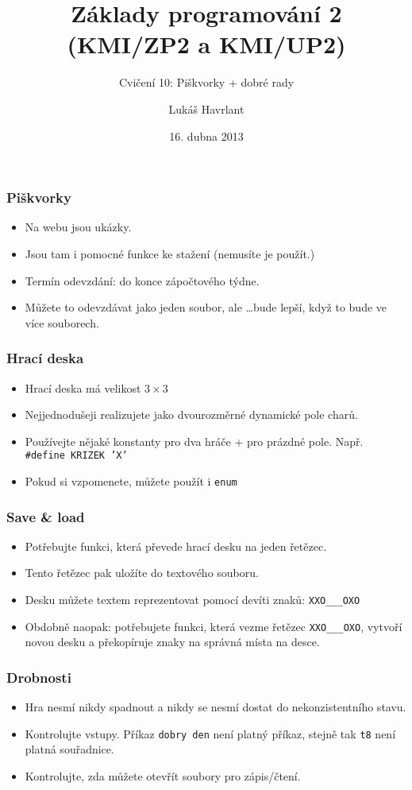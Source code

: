 \documentclass{beamer}
\title{Základy programování 2 (KMI/ZP2 a KMI/UP2)}
\subtitle{Cvičení 10: Piškvorky + dobré rady}
\author{Lukáš Havrlant}
\date{16. dubna 2013}
\institute{Univerzita Palackého}
\newenvironment{itemizex}%
  {\large \begin{itemize}%
    \setlength{\itemsep}{8pt}%
    \setlength{\parskip}{8pt}}%
  {\end{itemize}}
\begin{document}
\begin{frame}[t,plain]
\titlepage
\end{frame}


\begin{frame}[t,fragile]\frametitle{Piškvorky} 
    \begin{itemizex}
        \item Na webu jsou ukázky. 
        \item Jsou tam i pomocné funkce ke stažení (nemusíte je použít.)
        \item Termín odevzdání: do konce zápočtového týdne.
        \item Můžete to odevzdávat jako jeden soubor, ale \dots bude lepší, když to bude ve více souborech.
    \end{itemizex}
\end{frame}



\begin{frame}[t,fragile]\frametitle{Hrací deska} 
    \begin{itemizex}
        \item Hrací deska má velikost $3\times3$
        \item Nejjednodušeji realizujete jako dvourozměrné dynamické pole charů.
        \item Používejte nějaké konstanty pro dva hráče + pro prázdné pole. Např. \texttt{\#define KRIZEK 'X'}
        \item Pokud si vzpomenete, můžete použít i \texttt{enum}
    \end{itemizex}
\end{frame}


\begin{frame}[t,fragile]\frametitle{Save \& load} 
    \begin{itemizex}
        \item Potřebujte funkci, která převede hrací desku na jeden řetězec. 
        \item Tento řetězec pak uložíte do textového souboru.
        \item Desku můžete textem reprezentovat pomocí devíti znaků: \texttt{XXO\_\_\_OXO}
        \item Obdobně naopak: potřebujete funkci, která vezme řetězec \texttt{XXO\_\_\_OXO}, vytvoří novou desku a překopíruje znaky na správná místa na desce.
    \end{itemizex}
\end{frame}


\begin{frame}[t,fragile]\frametitle{Drobnosti} 
    \begin{itemizex}
        \item Hra nesmí nikdy spadnout a nikdy se nesmí dostat do nekonzistentního stavu.
        \item Kontrolujte vstupy. Příkaz \texttt{dobry den} není platný příkaz, stejně tak \texttt{t8} není platná souřadnice. 
        \item Kontrolujte, zda můžete otevřít soubory pro zápis/čtení. 
    \end{itemizex}
\end{frame}
\end{document}
